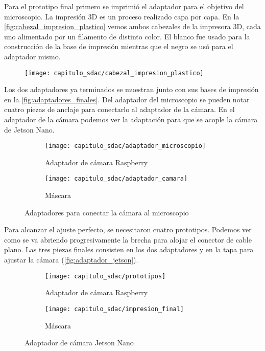 Para el prototipo final primero se imprimió el adaptador para el objetivo del
microscopio. La impresión 3D es un proceso realizado capa por capa. En la
\autoref{fig:cabezal_impresion_plastico} vemos ambos cabezales de la impresora
3D, cada uno alimentado por un filamento de distinto color. El blanco fue usado
para la construcción de la base de impresión mientras que el negro se usó para
el adaptador mismo.

\begin{figure}[H]
    \centering
    \texttt{[image: capitulo\_sdac/cabezal\_impresion\_plastico]}
    \caption{}\label{fig:cabezal_impresion_plastico}
\end{figure}

Los dos adaptadores ya terminados se muestran junto con sus bases de impresión
en la \autoref{fig:adaptadores_finales}. Del adaptador del  microscopio se
pueden notar cuatro piezas de anclaje para conectarlo al adaptador de la cámara.
En el adaptador de la cámara podemos ver la adaptación para que se acople la
cámara de Jetson Nano.

\begin{figure}[H]
    \centering
    \begin{subfigure}{.5\textwidth}
        \centering
        \texttt{[image: capitulo\_sdac/adaptador\_microscopio]}
        \caption{Adaptador de cámara Raspberry}
    \end{subfigure}%
    \begin{subfigure}{.5\textwidth}
        \centering
        \texttt{[image: capitulo\_sdac/adaptador\_camara]}
        \caption{Máscara}
    \end{subfigure}
    \caption{Adaptadores para conectar la cámara al microscopio}
    \label{fig:adaptadores_finales}
    \end{figure}

Para alcanzar el ajuste perfecto, se necesitaron cuatro prototipos. Podemos ver
como se va abriendo progresivamente la brecha para alojar el conector de cable
plano. Las tres piezas finales consisten en los dos adaptadores y en la tapa
para ajustar la cámara (\autoref{fig:adaptador_jetson}).

\begin{figure}[H]
    \centering
    \begin{subfigure}{.5\textwidth}
        \centering
        \texttt{[image: capitulo\_sdac/prototipos]}
        \caption{Adaptador de cámara Raspberry}
    \end{subfigure}%
    \begin{subfigure}{.5\textwidth}
        \centering
        \texttt{[image: capitulo\_sdac/impresion\_final]}
        \caption{Máscara}
    \end{subfigure}
    \caption{Adaptador de cámara Jetson Nano}
    \label{fig:adaptador_jetson}
\end{figure}

